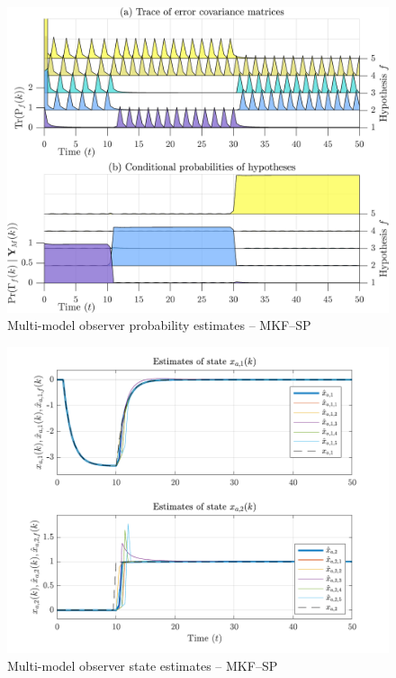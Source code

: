 \begin{figure}[htp]
	\centering
	\includegraphics[width=12cm]{images/rod_MKF_test_sim_MKF_SP_prob.png}
	\caption{Multi-model observer probability estimates – MKF--SP}
	\label{fig:rod-obs-sim-test-probs-SP}
\end{figure}
\begin{figure}[htp]
	\centering
	\includegraphics[width=13cm]{images/rod_MKF_test_sim_MKF_SP_x_est.pdf}
	\caption{Multi-model observer state estimates – MKF--SP}
	\label{fig:rod-obs-sim-test-x_est-SP}
\end{figure}
